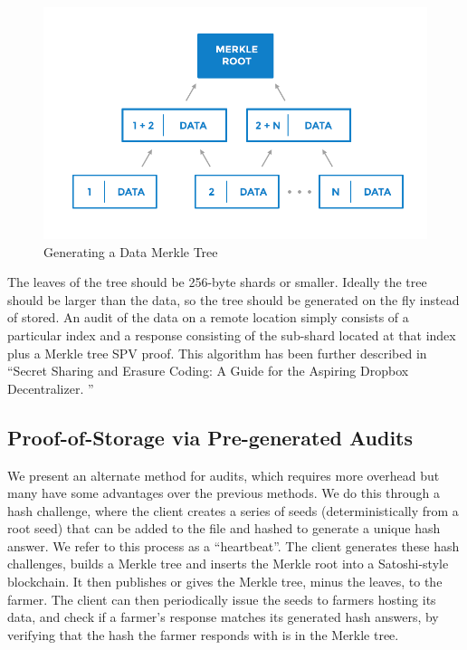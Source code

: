 \documentclass[a4paper,10pt]{article}
\begin{document}
\begin{figure}[hbt]
\centering
\includegraphics[width=\linewidth]{2}
\caption{Generating a Data Merkle Tree}
\end{figure}

 The leaves of the tree should be 256-byte shards or smaller. Ideally the tree should be larger than the data, so the tree should be generated on the fly instead of stored. An audit of the data on a remote location simply consists of a particular index and a response consisting of the sub-shard located at that index plus a Merkle tree SPV proof. This algorithm has been further described in “Secret Sharing and Erasure Coding: A Guide for the Aspiring Dropbox Decentralizer\cite{16}. ”  \\


\subsection{Proof-of-Storage via Pre-generated Audits}
We present an alternate method for audits, which requires more overhead but many have some advantages over the previous methods. We do this through a hash challenge, where the client creates a series of seeds (deterministically from a root seed) that can be added to the file and hashed to generate a unique hash answer. We refer to this process as a “heartbeat”. The client generates these hash challenges, builds a Merkle tree \cite{2} and inserts the Merkle root into a Satoshi-style blockchain. It then publishes or gives the Merkle tree, minus the leaves, to the farmer. The client can then periodically issue the seeds to farmers hosting its data, and check if a farmer’s response matches its generated hash answers, by verifying that the hash the farmer responds with is in the Merkle tree. \\
\end{document}
